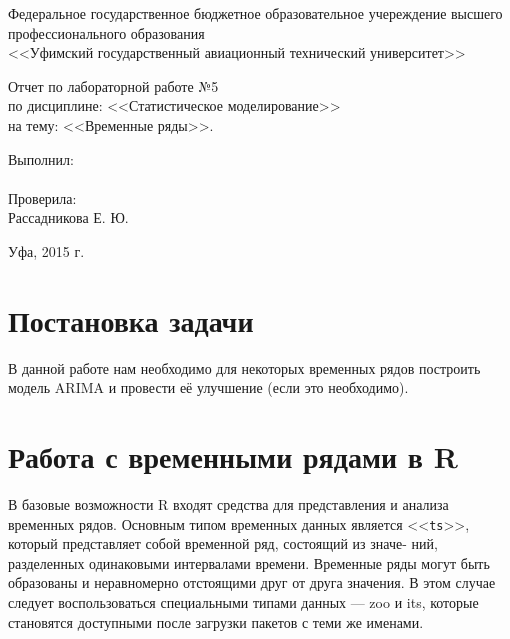 \documentclass[a4paper]{extarticle}
\author{Пахтусов Н. Г., ПРО-306}
\begin{document}

\begin{center}
\thispagestyle{empty} 

Федеральное государственное бюджетное образовательное учереждение высшего \\
профессионального образования\\
<<Уфимский государственный авиационный технический университет>>
\vspace*{\fill}
\begingroup
\centering

Отчет по лабораторной работе №5\\
по дисциплине: <<Статистическое моделирование>>\\
на тему: <<Временные ряды>>.

\endgroup
\vspace*{\fill}

\end{center}

\begin{flushright}

Выполнил:\\
\@author \\
Проверила: \\
Рассадникова Е. Ю.

\end{flushright}

\begin{center}
Уфа, 2015 г.
\end{center}

\clearpage
\tableofcontents
\clearpage



\section{Постановка задачи}

В данной работе нам необходимо для некоторых временных рядов построить модель ARIMA и провести её улучшение (если это необходимо).

\section{Работа с временными рядами в R}


В базовые возможности R входят средства для представления и анализа временных рядов. Основным типом временных данных является
<<\texttt{ts}>>, который представляет собой временной ряд, состоящий из значе-
ний, разделенных одинаковыми интервалами времени. Временные ряды могут быть образованы и неравномерно отстоящими друг от друга значения. В этом случае следует воспользоваться специальными типами данных — zoo и its, которые становятся доступными после загрузки
пакетов с теми же именами.
\end{document}
